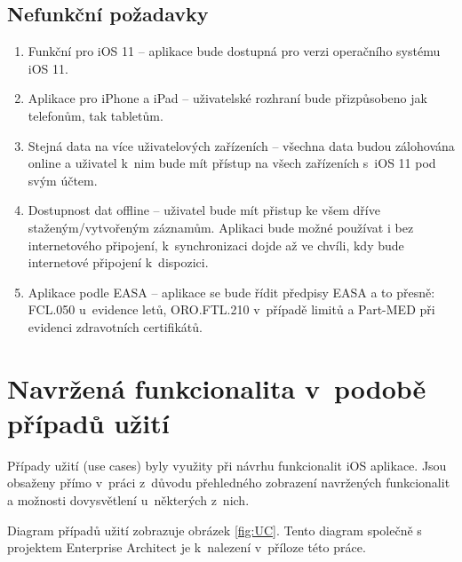 \documentclass[thesis=M,czech]{FITthesis}[2012/06/26]
\begin{document}
\subsection{Nefunkční požadavky}
\begin{enumerate}
\item Funkční pro iOS 11 -- aplikace bude dostupná pro verzi operačního systému iOS 11.
\item Aplikace pro iPhone a iPad -- uživatelské rozhraní bude přizpůsobeno jak telefonům, tak tabletům.
\item Stejná data na více uživatelových zařízeních -- všechna data budou zálohována online a uživatel k~nim bude mít přístup na všech zařízeních s~iOS 11 pod svým účtem.
\item Dostupnost dat offline -- uživatel bude mít přistup ke všem dříve staženým/vytvořeným záznamům. Aplikaci bude možné používat i bez internetového připojení, k~synchronizaci dojde až ve chvíli, kdy bude internetové připojení k~dispozici.
\item Aplikace podle EASA -- aplikace se bude řídit předpisy EASA a to přesně: FCL.050 u~evidence letů,  ORO.FTL.210 v~případě limitů a Part-MED při evidenci zdravotních certifikátů.
\end{enumerate}

\section{Navržená funkcionalita v~podobě případů užití}
Případy užití (use cases) byly využity při návrhu funkcionalit iOS aplikace. Jsou obsaženy přímo v~práci z~důvodu přehledného zobrazení navržených funkcionalit a možnosti dovysvětlení u~některých z~nich.

Diagram případů užití zobrazuje obrázek \ref{fig:UC}. Tento diagram společně s projektem Enterprise Architect je k~nalezení v~příloze této práce.
\end{document}
